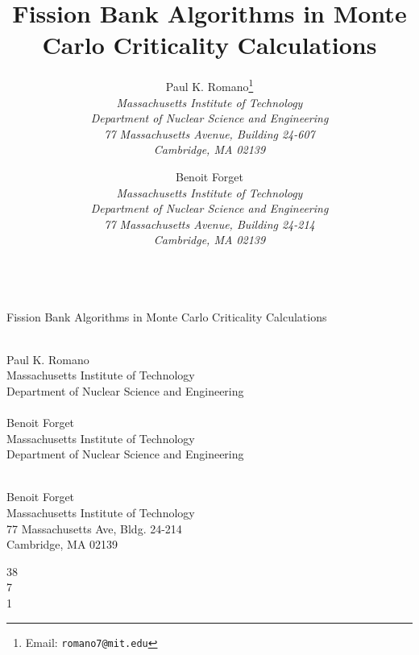 \documentclass[11pt]{article}
\begin{document}
 \\ Fission Bank Algorithms in Monte Carlo
Criticality Calculations
\vspace{12pt}

 \\
Paul K. Romano \\
Massachusetts Institute of Technology \\
Department of Nuclear Science and Engineering \\
\\
Benoit Forget \\
Massachusetts Institute of Technology \\
Department of Nuclear Science and Engineering
\vspace{12pt}

 \\
Benoit Forget \\
Massachusetts Institute of Technology \\
77 Massachusetts Ave, Bldg. 24-214 \\
Cambridge, MA 02139
\vspace{12pt}

 38 \\
 7 \\
 1

\setcounter{page}{0}
\thispagestyle{empty}

\title{Fission Bank Algorithms in Monte Carlo Criticality Calculations}
\author{Paul K. Romano\footnote{Email: \texttt{romano7@mit.edu}}\\
\em Massachusetts Institute of Technology\\
\em Department of Nuclear Science and Engineering\\
\em 77 Massachusetts Avenue, Building 24-607\\
\em Cambridge, MA 02139 \\
\and Benoit Forget \\
\em Massachusetts Institute of Technology \\
\em Department of Nuclear Science and Engineering\\
\em 77 Massachusetts Avenue, Building 24-214\\
\em Cambridge, MA 02139}
\date{}
\maketitle
\end{document}
